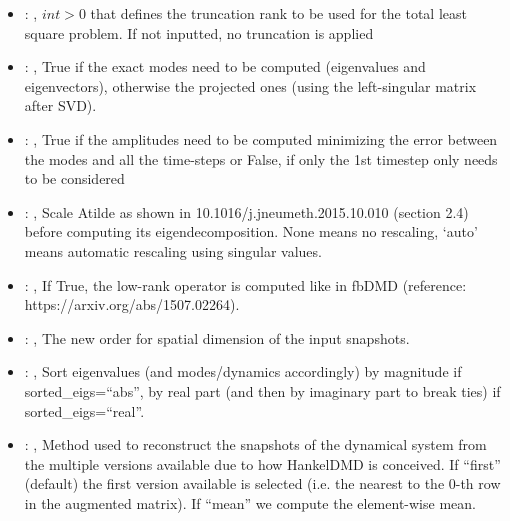 \begin{itemize}
    \item {}: , 
      $int > 0$ that defines the truncation rank to be used for the total
      least square problem. If not inputted, no truncation is applied

    \item {}: , 
      True if the exact modes need to be computed (eigenvalues and
      eigenvectors),   otherwise the projected ones (using the left-singular matrix after SVD).

    \item {}: , 
      True if the amplitudes need to be computed minimizing the error
      between the modes and all the time-steps or False, if only the 1st timestep only needs to be
      considered

    \item {}: , 
      Scale Atilde as shown in 10.1016/j.jneumeth.2015.10.010 (section 2.4) before computing its
      eigendecomposition. None means no rescaling, ‘auto’ means automatic rescaling using singular
      values.

    \item {}: , 
      If True, the low-rank operator is computed like in fbDMD (reference:
      https://arxiv.org/abs/1507.02264).

    \item {}: , 
      The new order for spatial dimension of the input snapshots.

    \item {}: , 
      Sort eigenvalues (and modes/dynamics accordingly) by magnitude if sorted\_eigs=``abs'',
      by real part (and then by imaginary part to break ties) if sorted\_eigs=``real''.

    \item {}: , 
      Method used to reconstruct the snapshots of the dynamical system from the multiple versions
      available                                                  due to how HankelDMD is conceived.
      If ``first'' (default) the first version available is selected
      (i.e. the nearest to the 0-th row in the augmented matrix). If ``mean'' we compute the
      element-wise mean.
  \end{itemize}

